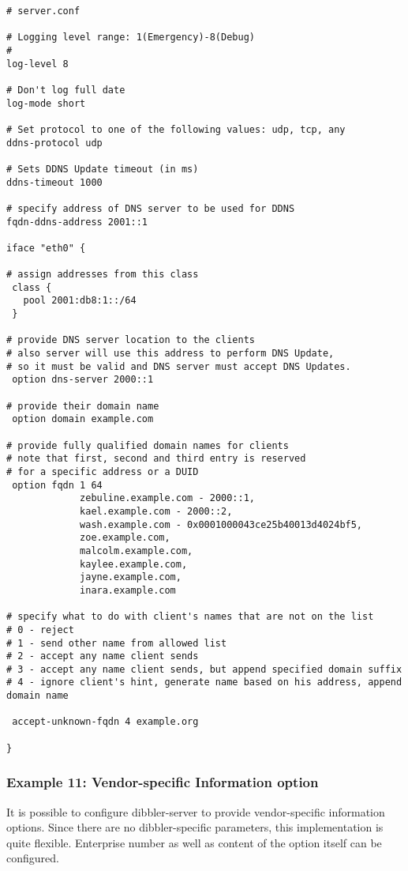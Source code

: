 \begin{lstlisting}
# server.conf

# Logging level range: 1(Emergency)-8(Debug)
#
log-level 8

# Don't log full date
log-mode short

# Set protocol to one of the following values: udp, tcp, any
ddns-protocol udp

# Sets DDNS Update timeout (in ms)
ddns-timeout 1000

# specify address of DNS server to be used for DDNS
fqdn-ddns-address 2001::1

iface "eth0" {

# assign addresses from this class
 class {
   pool 2001:db8:1::/64
 }

# provide DNS server location to the clients
# also server will use this address to perform DNS Update,
# so it must be valid and DNS server must accept DNS Updates.
 option dns-server 2000::1

# provide their domain name
 option domain example.com

# provide fully qualified domain names for clients
# note that first, second and third entry is reserved
# for a specific address or a DUID
 option fqdn 1 64
             zebuline.example.com - 2000::1,
             kael.example.com - 2000::2,
             wash.example.com - 0x0001000043ce25b40013d4024bf5,
             zoe.example.com,
             malcolm.example.com,
             kaylee.example.com,
             jayne.example.com,
             inara.example.com

# specify what to do with client's names that are not on the list
# 0 - reject
# 1 - send other name from allowed list
# 2 - accept any name client sends
# 3 - accept any name client sends, but append specified domain suffix
# 4 - ignore client's hint, generate name based on his address, append domain name

 accept-unknown-fqdn 4 example.org

}
\end{lstlisting}

\subsubsection{Example 11: Vendor-specific Information option}
\label{example-server-vendor-spec}
It is possible to configure dibbler-server to provide vendor-specific
information options. Since there are no dibbler-specific parameters,
this implementation is quite flexible. Enterprise number as well as
content of the option itself can be configured.

